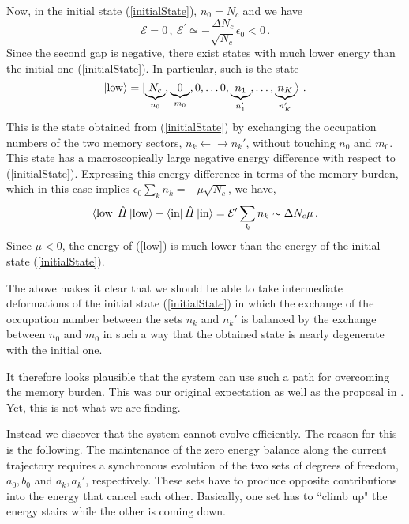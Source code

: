 \documentclass[aps,prd,reprint,superscriptaddress,nofootinbib]{revtex4-2}
\begin{document}
Now,  in the initial state (\ref{initialState}), 
$n_0=N_c$ and we have 
\begin{equation} 
{\mathcal E}  = 0 \,,~  {\mathcal E}^{'} \simeq - \frac{\Delta N_c}{\sqrt{N_c}}\epsilon_{0}  < 0\, .
\end{equation}
Since the second gap is negative, there exist states 
with much lower energy than the initial one
(\ref{initialState}).  In particular, such is the state 
\begin{equation} \label{low}
\ket{\text{low}}=\ket{\underbrace{N_c}_{n_0},\underbrace{0}_{m_0},0, \ldots 0, \underbrace{n_1}_{n'_1}, \ldots, \underbrace{n_K}_{n'_{K}}} \,.
\end{equation}
This is the state obtained from (\ref{initialState}) by exchanging the occupation numbers of the two memory sectors, 
$n_k \leftarrow \rightarrow n_k' $, without touching 
$n_0$ and $m_0$.  
This state has a macroscopically large negative 
energy difference with respect to (\ref{initialState}). 
Expressing this energy difference 
in terms of the memory burden, which in this case implies    
$\epsilon_0 \sum_k n_k = - \mu \sqrt{N_c}$,  we have, 
\begin{equation} 
\bra{\text{low}} \hat{H} \ket{\text{low}} 
- \bra{\text{in}} \hat{H} \ket{\text{in}}
= {\mathcal E}' \sum_k n_k \sim 
\Delta N_c \mu \,. 
\end{equation} 
Since $\mu < 0$, 
the energy of  (\ref{low})
is much lower than the energy of the initial state (\ref{initialState}). 

The above makes it clear that we should be able 
to take intermediate deformations of the initial state
(\ref{initialState})
in which 
the exchange of the occupation number between the sets 
$n_k$ and $n_k'$ is balanced by the exchange
between $n_0$ and $m_0$ in such a way that the 
obtained state is nearly degenerate with the initial one. 

It therefore looks plausible that the system can use such a path 
for overcoming the memory burden. 
This was our original expectation as well as the proposal in 
\cite{1810.02336, 1812.08749}. 
Yet, this is not what we are finding. 

Instead we discover that the system cannot evolve efficiently. 
The reason for this is the following. 
The maintenance of the zero energy balance along the 
current trajectory requires a synchronous evolution of the two 
sets of degrees of freedom,  $a_0,b_0$ and $a_k,a_k'$, respectively. 
These sets have to produce opposite contributions  
into the energy that cancel each other.  
Basically, one set has to ``climb up" the energy stairs while the other 
is coming down.  
\end{document}
